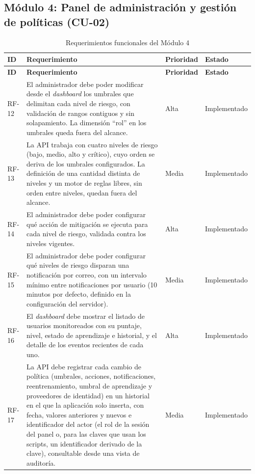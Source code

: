 \subsection{Módulo 4: Panel de administración y gestión de políticas (CU-02)}
\begin{tablacompacta}
\begin{longtable}{P{1.1cm}P{9.3cm}C{1.6cm}P{2.6cm}}
	\caption{Requerimientos funcionales del Módulo 4}
	\label{tab:rf-modulo4}\\
	\hline
	\textbf{ID} & \textbf{Requerimiento} & \textbf{Prioridad} & \textbf{Estado} \\
	\hline
	\endfirsthead
	\hline
	\textbf{ID} & \textbf{Requerimiento} & \textbf{Prioridad} & \textbf{Estado} \\
	\hline
	\endhead
	RF-12 & El administrador debe poder modificar desde el \emph{dashboard} los umbrales que delimitan cada nivel de riesgo, con validación de rangos contiguos y sin solapamiento. La dimensión ``rol'' en los umbrales queda fuera del alcance. & Alta & Implementado \\
	\hline
	RF-13 & La API trabaja con cuatro niveles de riesgo (bajo, medio, alto y crítico), cuyo orden se deriva de los umbrales configurados. La definición de una cantidad distinta de niveles y un motor de reglas libres, sin orden entre niveles, quedan fuera del alcance. & Media & Implementado \\
	\hline
	RF-14 & El administrador debe poder configurar qué acción de mitigación se ejecuta para cada nivel de riesgo, validada contra los niveles vigentes. & Alta & Implementado \\
	\hline
	RF-15 & El administrador debe poder configurar qué niveles de riesgo disparan una notificación por correo, con un intervalo mínimo entre notificaciones por usuario (10 minutos por defecto, definido en la configuración del servidor). & Media & Implementado \\
	\hline
	RF-16 & El \emph{dashboard} debe mostrar el listado de usuarios monitoreados con su puntaje, nivel, estado de aprendizaje e historial, y el detalle de los eventos recientes de cada uno. & Alta & Implementado \\
	\hline
	RF-17 & La API debe registrar cada cambio de política (umbrales, acciones, notificaciones, reentrenamiento, umbral de aprendizaje y proveedores de identidad) en un historial en el que la aplicación solo inserta, con fecha, valores anteriores y nuevos e identificador del actor (el rol de la sesión del panel o, para las claves que usan los scripts, un identificador derivado de la clave), consultable desde una vista de auditoría. & Media & Implementado \\

\end{longtable}
\end{tablacompacta}

